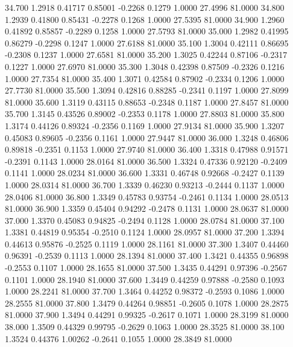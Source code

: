   34.700   1.2918   0.41717   0.85001  -0.2268   0.1279   1.0000  27.4996  81.0000
  34.800   1.2939   0.41800   0.85431  -0.2278   0.1268   1.0000  27.5395  81.0000
  34.900   1.2960   0.41892   0.85857  -0.2289   0.1258   1.0000  27.5793  81.0000
  35.000   1.2982   0.41995   0.86279  -0.2298   0.1247   1.0000  27.6188  81.0000
  35.100   1.3004   0.42111   0.86695  -0.2308   0.1237   1.0000  27.6581  81.0000
  35.200   1.3025   0.42244   0.87106  -0.2317   0.1227   1.0000  27.6970  81.0000
  35.300   1.3048   0.42398   0.87509  -0.2326   0.1216   1.0000  27.7354  81.0000
  35.400   1.3071   0.42584   0.87902  -0.2334   0.1206   1.0000  27.7730  81.0000
  35.500   1.3094   0.42816   0.88285  -0.2341   0.1197   1.0000  27.8099  81.0000
  35.600   1.3119   0.43115   0.88653  -0.2348   0.1187   1.0000  27.8457  81.0000
  35.700   1.3145   0.43526   0.89002  -0.2353   0.1178   1.0000  27.8803  81.0000
  35.800   1.3174   0.44126   0.89324  -0.2356   0.1169   1.0000  27.9134  81.0000
  35.900   1.3207   0.45083   0.89605  -0.2356   0.1161   1.0000  27.9447  81.0000
  36.000   1.3248   0.46806   0.89818  -0.2351   0.1153   1.0000  27.9740  81.0000
  36.400   1.3318   0.47988   0.91571  -0.2391   0.1143   1.0000  28.0164  81.0000
  36.500   1.3324   0.47336   0.92120  -0.2409   0.1141   1.0000  28.0234  81.0000
  36.600   1.3331   0.46748   0.92668  -0.2427   0.1139   1.0000  28.0314  81.0000
  36.700   1.3339   0.46230   0.93213  -0.2444   0.1137   1.0000  28.0406  81.0000
  36.800   1.3349   0.45783   0.93754  -0.2461   0.1134   1.0000  28.0513  81.0000
  36.900   1.3359   0.45404   0.94292  -0.2478   0.1131   1.0000  28.0637  81.0000
  37.000   1.3370   0.45083   0.94825  -0.2494   0.1128   1.0000  28.0784  81.0000
  37.100   1.3381   0.44819   0.95354  -0.2510   0.1124   1.0000  28.0957  81.0000
  37.200   1.3394   0.44613   0.95876  -0.2525   0.1119   1.0000  28.1161  81.0000
  37.300   1.3407   0.44460   0.96391  -0.2539   0.1113   1.0000  28.1394  81.0000
  37.400   1.3421   0.44355   0.96898  -0.2553   0.1107   1.0000  28.1655  81.0000
  37.500   1.3435   0.44291   0.97396  -0.2567   0.1101   1.0000  28.1940  81.0000
  37.600   1.3449   0.44259   0.97888  -0.2580   0.1093   1.0000  28.2241  81.0000
  37.700   1.3464   0.44252   0.98372  -0.2593   0.1086   1.0000  28.2555  81.0000
  37.800   1.3479   0.44264   0.98851  -0.2605   0.1078   1.0000  28.2875  81.0000
  37.900   1.3494   0.44291   0.99325  -0.2617   0.1071   1.0000  28.3199  81.0000
  38.000   1.3509   0.44329   0.99795  -0.2629   0.1063   1.0000  28.3525  81.0000
  38.100   1.3524   0.44376   1.00262  -0.2641   0.1055   1.0000  28.3849  81.0000
